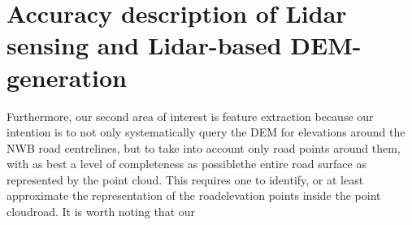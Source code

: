 \section*{Accuracy description of Lidar sensing and Lidar-based DEM-generation}

Furthermore, our second area of interest is feature extraction because our intention is to not only systematically query the DEM for elevations around the NWB road centrelines, but to take into account only road points around them, with as best a level of completeness as possiblethe entire road surface as represented by the point cloud. This requires one to identify, or at least approximate the representation of the roadelevation points inside the point cloudroad. It is worth noting that our